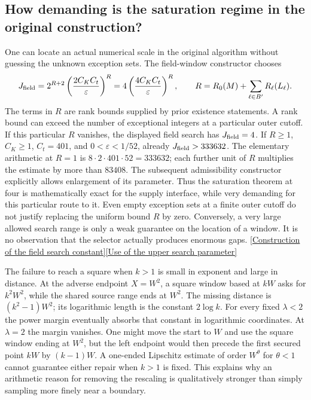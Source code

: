 \documentclass[12pt,letterpaper]{article}
\begin{document}
\subsection{How demanding is the saturation regime in the original construction?}
One can locate an actual numerical scale in the original algorithm without guessing the unknown exception sets. The field-window constructor chooses
\[
 J_{\rm field}=2^{R+2}\left(\frac{2C_K C_t}{\varepsilon}\right)^R
              =4\left(\frac{4 C_K C_t}{\varepsilon}\right)^R ,
 \qquad R=R_0(M)+\sum_{\ell\in B'}R_\ell(L_\ell).
\]
The terms in \(R\) are rank bounds supplied by prior existence statements. A rank bound can exceed the number of exceptional integers at a particular outer cutoff. If this particular \(R\) vanishes, the displayed field search has \(J_{\rm field}=4\). If \(R\ge1\), \(C_K\ge1\), \(C_t=401\), and \(0<\varepsilon<1/52\), already \(J_{\rm field}>333632\). The elementary arithmetic at \(R=1\) is \(8\cdot 2\cdot401\cdot52=333632\); each further unit of \(R\) multiplies the estimate by more than \(83408\). The subsequent admissibility constructor explicitly allows enlargement of its parameter. Thus the saturation theorem at four is mathematically exact for the supply interface, while very demanding for this particular route to it. Even empty exception sets at a finite outer cutoff do not justify replacing the uniform bound \(R\) by zero. Conversely, a very large allowed search range is only a weak guarantee on the location of a window. It is no observation that the selector actually produces enormous gaps. \href{https://github.com/nousentllc/riemann-hypothesis/blob/40e56bab026552e089d7afcfeff08d2defb9c005/src/Development/AutomorphicArithmetic/AutomorphicVarieties/LayeredIsomorphisms/ThmBabOf.lean#L15-L29}{[Construction of the field search constant]}\quad\href{https://github.com/nousentllc/riemann-hypothesis/blob/40e56bab026552e089d7afcfeff08d2defb9c005/src/Development/AutomorphicArithmetic/AutomorphicVarieties/CMFieldExponentialBounds/AdmissibleOfPageN.lean#L45-L60}{[Use of the upper search parameter]}

The failure to reach a square when \(k>1\) is small in exponent and large in distance. At the adverse endpoint \(X=W^2\), a square window based at \(kW\) asks for \(k^2W^2\), while the shared source range ends at \(W^2\). The missing distance is \((k^2-1)W^2\); its logarithmic length is the constant \(2\log k\). For every fixed \(\lambda<2\) the power margin eventually absorbs that constant in logarithmic coordinates. At \(\lambda=2\) the margin vanishes. One might move the start to \(W\) and use the square window ending at \(W^2\), but the left endpoint would then precede the first secured point \(kW\) by \((k-1)W\). A one-ended Lipschitz estimate of order \(W^\theta\) for \(\theta<1\) cannot guarantee either repair when \(k>1\) is fixed. This explains why an arithmetic reason for removing the rescaling is qualitatively stronger than simply sampling more finely near a boundary.
\end{document}
